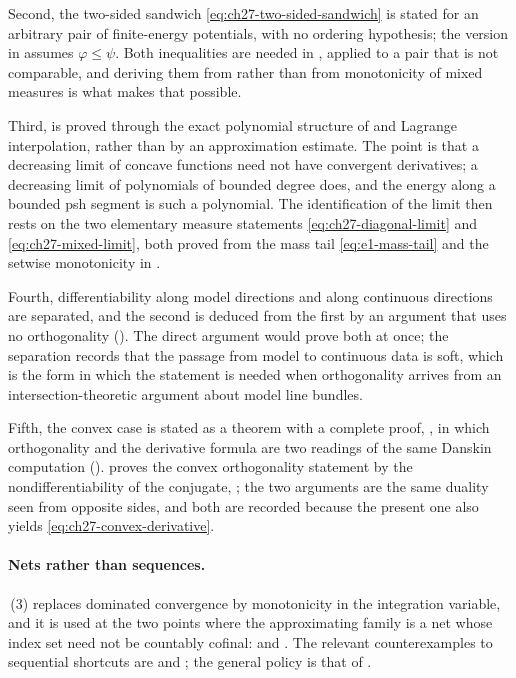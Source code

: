 Second, the two-sided sandwich \eqref{eq:ch27-two-sided-sandwich} is stated
for an arbitrary pair of finite-energy potentials, with no ordering
hypothesis; the version in  assumes
\(\varphi\leq\psi\).  Both inequalities are needed in
, applied to a pair that is
not comparable, and deriving them from
 rather than from monotonicity of mixed
measures is what makes that possible.

Third,  is proved through the exact
polynomial structure of  and Lagrange
interpolation, rather than by an approximation estimate.  The point is that
a decreasing limit of concave functions need not have convergent
derivatives; a decreasing limit of polynomials of bounded degree does, and
the energy along a bounded psh segment is such a polynomial.  The
identification of the limit then rests on the two elementary measure
statements \eqref{eq:ch27-diagonal-limit} and
\eqref{eq:ch27-mixed-limit}, both proved from the mass tail
\eqref{eq:e1-mass-tail} and the setwise monotonicity in
.

Fourth, differentiability along model directions and along continuous
directions are separated, and the second is deduced from the first by an
argument that uses no orthogonality
().  The direct argument would prove both at once;
the separation records that the passage from model to continuous data is
soft, which is the form in which the statement is needed when orthogonality
arrives from an intersection-theoretic argument about model line bundles.

Fifth, the convex case is stated as a theorem with a complete proof,
, in which orthogonality and the
derivative formula are two readings of the same Danskin computation
().   proves the
convex orthogonality statement by the nondifferentiability of the conjugate,
; the two arguments are the
same duality seen from opposite sides, and both are recorded because the
present one also yields \eqref{eq:ch27-convex-derivative}.

\paragraph{Nets rather than sequences.}
\,(3) replaces dominated convergence by
monotonicity in the integration variable, and it is used at the two points
where the approximating family is a net whose index set need not be
countably cofinal:  and
.  The relevant counterexamples to
sequential shortcuts are  and
; the general policy is that of
.

